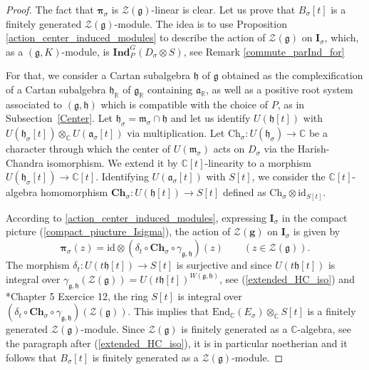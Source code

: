 \documentclass{amsart}
\theoremstyle{definition}
\begin{document}
\begin{proof}
    The fact that $\bm{\pi}_\sigma$ is $\mathcal{Z}(\bm{\mathfrak{g}})$-linear is clear. Let us prove that $B_\sigma[t]$ is a finitely generated $\mathcal{Z}(\bm{\mathfrak{g}})$-module. The idea is to use Proposition \ref{action_center_induced_modules} to describe the action of $\mathcal{Z}(\mathfrak{g})$ on $\bm{I}_\sigma$, which, as a $(\bm{\mathfrak{g}},K)$-module, is $\mathbf{Ind}_{P}^G(D_\sigma \otimes S)$, see Remark \ref{commute_parInd_for}
    
    For that, we consider a Cartan subalgebra $\mathfrak{h}$ of $\mathfrak{g}$ obtained as the complexification of a Cartan subalgebra $\mathfrak{h}_\mathbb{R}$ of $\mathfrak{g}_\mathbb{R}$ containing $\mathfrak{a}_\mathbb{R}$, as well as a positive root system associated to $(\mathfrak{g},\mathfrak{h})$ which is compatible with the choice of $P$, as in Subsection~\ref{Center}. Let $\mathfrak{h}_\sigma = \mathfrak{m}_\sigma \cap \mathfrak{h}$ and let us identify $U(\mathfrak{h}[t])$ with $U(\mathfrak{h}_\sigma[t]) \otimes_{\mathbb{C}}U(\mathfrak{a}_\sigma[t])$ via multiplication. Let $\mathrm{Ch}_\sigma : U(\mathfrak{h}_\sigma) \to \mathbb{C}$ be a character through which the center of $U(\mathfrak{m}_\sigma)$ acts on $D_\sigma$ via the Harish-Chandra isomorphism. We extend it by $\mathbb{C}[t]$-linearity to a morphism $U(\mathfrak{h}_\sigma[t]) \to \mathbb{C}[t]$. Identifying $U(\mathfrak{a}_\sigma[t])$ with $S[t]$, we consider the $\mathbb{C}[t]$-algebra homomorphism $\mathbf{Ch}_\sigma : U(\mathfrak{h}[t]) \to S[t]$ defined as $\mathrm{Ch}_\sigma \otimes \mathrm{id}_{S[t]}$.

    According to \ref{action_center_induced_modules}, expressing $\bm{I}_\sigma$ in the compact picture (\ref{compact_piucture_Isigma}), the action of $ \mathcal{Z}(\mathbf{g})$ on $\bm{I}_\sigma$ is given by
    \[\bm{\pi}_\sigma(z) = \mathrm{id} \otimes (\delta_t\circ\mathbf{Ch}_\sigma\circ\gamma_{\mathfrak{g},\mathfrak{h}})(z) \qquad (z \in \mathcal{Z}(\bm{\mathfrak{g}})).\]
    The morphism $\delta_t : U(t\mathfrak{h}[t]) \to S[t]$ is surjective and since $U(t\mathfrak{h}[t])$ is integral over $\gamma_{\mathfrak{g},\mathfrak{h}}(\mathcal{Z}(\bm{\mathfrak{g}})) = U(t\mathfrak{h}[t])^{W(\mathfrak{g},\mathfrak{h})}$, see (\ref{extended_HC_iso}) and \cite{AtiyahMacDonald}*{Chapter 5 Exercice 12}, the ring $S[t]$ is integral over $(\delta_t\circ\mathbf{Ch}_\sigma\circ\gamma_{\mathfrak{g},\mathfrak{h}})(\mathcal{Z}(\bm{\mathfrak{g}}))$. This implies that $\mathrm{End}_\mathbb{C}(E_\sigma) \otimes_\mathbb{C} S[t]$ is a finitely generated $\mathcal{Z}(\bm{\mathfrak{g}})$-module. Since $\mathcal{Z}(\bm{\mathfrak{g}})$ is finitely generated as a $\mathbb{C}$-algebra, see the paragraph after (\ref{extended_HC_iso}), it is in particular noetherian and it follows that $B_\sigma[t]$ is finitely generated as a $\mathcal{Z}(\bm{\mathfrak{g}})$-module.
    
\end{proof}
\end{document}
